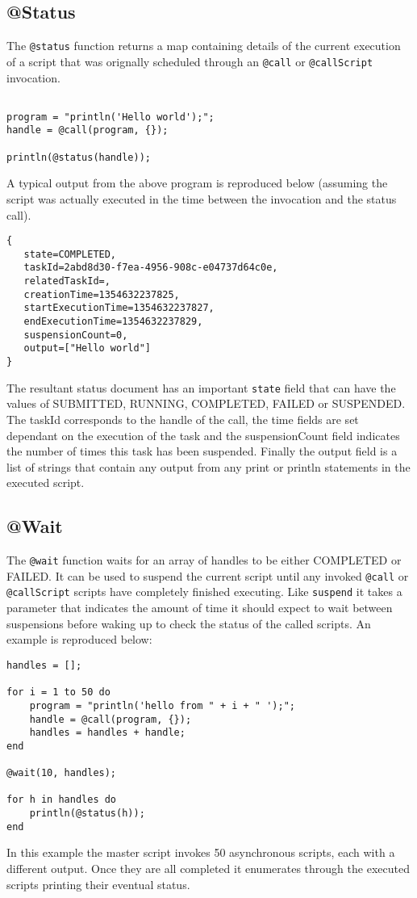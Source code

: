 \subsection{@Status}

The \verb+@status+ function returns a map containing details of the current execution of a script that was orignally scheduled through an \verb+@call+ or \verb+@callScript+ invocation.

\begin{lstlisting}[caption={Example @Status}]

program = "println('Hello world');";
handle = @call(program, {});

println(@status(handle));

\end{lstlisting}

A typical output from the above program is reproduced below (assuming the script was actually executed in the time between the invocation and the status call).

\begin{Verbatim}
{
   state=COMPLETED,
   taskId=2abd8d30-f7ea-4956-908c-e04737d64c0e,
   relatedTaskId=,
   creationTime=1354632237825,
   startExecutionTime=1354632237827,
   endExecutionTime=1354632237829,
   suspensionCount=0,
   output=["Hello world"]
}
\end{Verbatim}

The resultant status document has an important \verb+state+ field that can have the values of SUBMITTED, RUNNING, COMPLETED, FAILED or SUSPENDED. The taskId corresponds to the handle of the call, the time fields are set dependant on the execution of the task and the suspensionCount field indicates the number of times this task has been suspended. Finally the output field is a list of strings that contain any output from any print or println statements in the executed script.

\subsection{@Wait}
The \verb+@wait+ function waits for an array of handles to be either COMPLETED or FAILED. It can be used to suspend the current script until any invoked \verb+@call+ or \verb+@callScript+ scripts have completely finished executing. Like \verb+suspend+ it takes a parameter that indicates the amount of time it should expect to wait between suspensions before waking up to check the status of the called scripts. An example is reproduced below:

\begin{lstlisting}[caption={Call and Wait example}]
handles = [];

for i = 1 to 50 do
    program = "println('hello from " + i + " ');";
    handle = @call(program, {});
    handles = handles + handle;
end

@wait(10, handles);

for h in handles do
    println(@status(h));
end
\end{lstlisting}
In this example the master script invokes 50 asynchronous scripts, each with a different output. Once they are all completed it enumerates through the executed scripts printing their eventual status.
